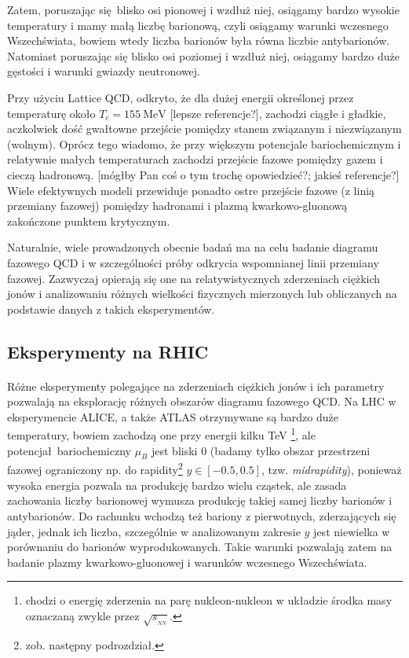 \documentclass[a4paper,12pt]{article}
\begin{document}
Zatem, poruszając się blisko osi pionowej i wzdłuż niej, osiągamy bardzo wysokie temperatury i mamy małą liczbę barionową, czyli osiągamy warunki wczesnego Wszechświata, bowiem wtedy liczba barionów była równa liczbie antybarionów. Natomiast poruszając się blisko osi poziomej i wzdłuż niej, osiągamy bardzo duże gęstości i warunki gwiazdy neutronowej.

Przy użyciu Lattice QCD, odkryto, że dla dużej energii określonej przez temperaturę około $T_c = 155~\text{MeV}$ \cite{Andronic:2017pug} {\color{blue}[lepsze referencje?]}, zachodzi ciągłe i gładkie, aczkolwiek dość gwałtowne przejście pomiędzy stanem związanym i niezwiązanym (wolnym). Oprócz tego wiadomo, że przy większym potencjale bariochemicznym i relatywnie małych temperaturach zachodzi przejście fazowe pomiędzy gazem i cieczą hadronową. {\color{blue} [mógłby Pan coś o tym trochę opowiedzieć?; jakieś referencje?]} Wiele efektywnych modeli przewiduje ponadto ostre przejście fazowe (z linią przemiany fazowej) pomiędzy hadronami i plazmą kwarkowo-gluonową zakończone punktem krytycznym. 

Naturalnie, wiele prowadzonych obecnie badań ma na celu badanie diagramu fazowego QCD i w szczególności próby odkrycia wspomnianej linii przemiany fazowej. Zazwyczaj opierają się one na relatywistycznych zderzeniach ciężkich jonów i analizowaniu różnych wielkości fizycznych mierzonych lub obliczanych na podstawie danych z takich eksperymentów. 

\subsection{Eksperymenty na RHIC}
\paragraph{}
Różne eksperymenty polegające na zderzeniach ciężkich jonów i ich parametry pozwalają na eksplorację różnych obszarów diagramu fazowego QCD. Na LHC w eksperymencie ALICE, a także ATLAS otrzymywane są bardzo duże temperatury, bowiem zachodzą one przy energii kilku TeV \footnote{chodzi o energię zderzenia na parę nukleon-nukleon w układzie środka masy oznaczaną zwykle przez  $\sqrt{s_{_{NN}}}$.}, ale potencjał bariochemiczny $\mu_B$ jest bliski 0 (badamy tylko obszar przestrzeni fazowej ograniczony np. do rapidity\footnote{zob. następny podrozdział.} $y \in [-0.5, 0.5]$, tzw. \textit{midrapidity}), ponieważ wysoka energia pozwala na produkcję bardzo wielu cząstek, ale zasada zachowania liczby barionowej wymusza produkcję takiej samej liczby barionów i antybarionów. Do rachunku wchodzą też bariony z pierwotnych, zderzających się jąder, jednak ich liczba, szczególnie w analizowanym zakresie $y$ jest niewielka w porównaniu do barionów wyprodukowanych. Takie warunki pozwalają zatem na badanie plazmy kwarkowo-gluonowej i warunków wczesnego Wszechświata.
\end{document}
